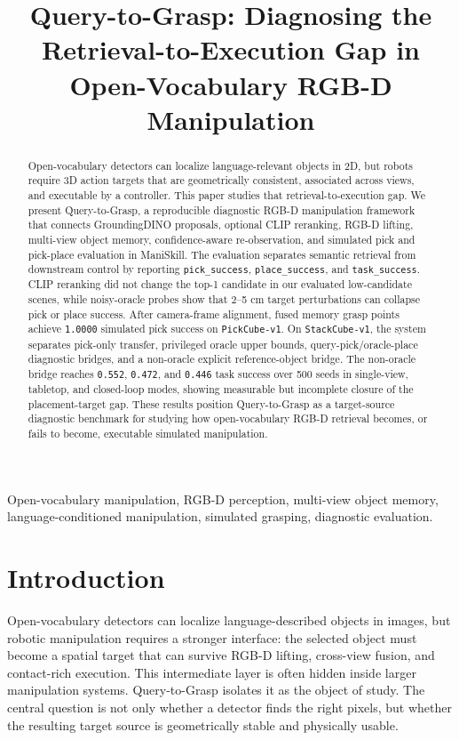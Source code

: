 \documentclass[conference]{IEEEtran}
\title{Query-to-Grasp: Diagnosing the Retrieval-to-Execution Gap in Open-Vocabulary RGB-D Manipulation}
\author{\IEEEauthorblockN{Zhuo Chen}
\IEEEauthorblockA{\textit{Chalmers University of Technology}\\
Gothenburg, Sweden\\
zhuoc@chalmers.se}}
\begin{document}
\maketitle

\begin{abstract}
Open-vocabulary detectors can localize language-relevant objects in 2D, but
robots require 3D action targets that are geometrically consistent, associated
across views, and executable by a controller. This paper studies that
retrieval-to-execution gap. We present Query-to-Grasp, a reproducible
diagnostic RGB-D manipulation framework that connects GroundingDINO proposals,
optional CLIP reranking, RGB-D lifting, multi-view object memory,
confidence-aware re-observation, and simulated pick and pick-place evaluation
in ManiSkill. The evaluation separates semantic retrieval from downstream
control by reporting \texttt{pick\_success}, \texttt{place\_success}, and
\texttt{task\_success}. CLIP reranking did not change the top-1 candidate in
our evaluated low-candidate scenes, while noisy-oracle probes show that 2--5 cm
target perturbations can collapse pick or place success. After camera-frame
alignment, fused memory grasp points achieve \texttt{1.0000} simulated pick
success on \texttt{PickCube-v1}. On \texttt{StackCube-v1}, the system separates
pick-only transfer, privileged oracle upper bounds, query-pick/oracle-place
diagnostic bridges, and a non-oracle explicit reference-object bridge. The
non-oracle bridge reaches \texttt{0.552}, \texttt{0.472}, and \texttt{0.446}
task success over 500 seeds in single-view, tabletop, and closed-loop modes,
showing measurable but incomplete closure of the placement-target gap. These results position
Query-to-Grasp as a target-source diagnostic benchmark for studying how
open-vocabulary RGB-D retrieval becomes, or fails to become, executable
simulated manipulation.
\end{abstract}

\begin{IEEEkeywords}
Open-vocabulary manipulation, RGB-D perception, multi-view object memory,
language-conditioned manipulation, simulated grasping, diagnostic evaluation.
\end{IEEEkeywords}

\section{Introduction}

Open-vocabulary detectors can localize language-described objects in images,
but robotic manipulation requires a stronger interface: the selected object
must become a spatial target that can survive RGB-D lifting, cross-view fusion,
and contact-rich execution. This intermediate layer is often hidden inside
larger manipulation systems. Query-to-Grasp isolates it as the object of study.
The central question is not only whether a detector finds the right pixels, but
whether the resulting target source is geometrically stable and physically
usable.
\end{document}
